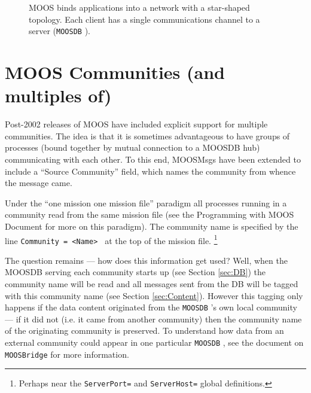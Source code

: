 \documentclass[a4paper,10pt]{article}
\newcommand{\Code}[1]{\texttt{#1} }
\newcommand{\code}[1]{\Code{#1} }
\newcommand{\DB}   {\code{{MOOSDB}}}
\begin{document}
\begin{figure}[ht!]
\centering  {}
\caption{MOOS binds applications into a network with a star-shaped
topology. Each client has a single communications channel to a
server (\DB).} \label{fig:Topology}
\end{figure}

\section{MOOS Communities (and multiples
of)}\label{sec:Communities}

Post-2002 releases of MOOS have included explicit support
for multiple communities. The idea is that it is sometimes
advantageous to have groups of processes (bound together by mutual
connection to a MOOSDB hub) communicating with each other. To this
end, MOOSMsgs have been extended to include a ``Source
Community'' field, which names the community from whence the
message came.

Under the ``one mission one mission file'' paradigm all processes
running  in a community read from the same mission file (see the Programming with MOOS Document for more on this paradigm). The community name is specified by
the line \code{Community = <Name> } at the top of the mission
file. \footnote{Perhaps near the \code{ServerPort=} and
\code{ServerHost=} global definitions.}

The question remains --- how does this information get used? Well,
when the MOOSDB serving each community starts up (see Section
\ref{sec:DB}) the community name will be read and all messages
sent from the DB will be tagged with this community name (see
Section \ref{sec:Content}). However this tagging only happens if
the data content originated from the \DB's own local community
--- if it did not (i.e. it came from another community) then the
community name of the originating community is preserved. To
understand how data from an external community could appear in one
particular \DB, see the document on \code{MOOSBridge} for more information.
\end{document}
